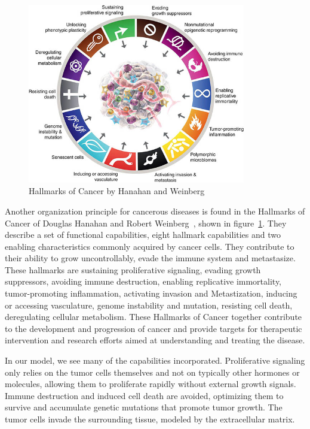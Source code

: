 \begin{figure}[h]
    \centering
    \includegraphics[width=0.85\textwidth]{resources/images/Hallmarks-of-Cancer.jpg}
    \caption{Hallmarks of Cancer by Hanahan and Weinberg~\cite{10.1158/2159-8290.CD-21-1059}}
    \label{fig:hallmarks_of_cancer}
\end{figure}
Another organization principle for cancerous diseases is found in the Hallmarks of Cancer of Douglas Hanahan and Robert Weinberg~\cite{10.1158/2159-8290.CD-21-1059}, shown in figure~\ref{fig:hallmarks_of_cancer}. They describe a set of functional capabilities, eight hallmark capabilities and two enabling characteristics commonly acquired by cancer cells. They contribute to their ability to grow uncontrollably, evade the immune system and metastasize. These hallmarks are sustaining proliferative signaling, evading growth suppressors, avoiding immune destruction, enabling replicative immortality, tumor-promoting inflammation, activating invasion and Metastization, inducing or accessing vasculature, genome instability and mutation, resisting cell death, deregulating cellular metabolism. These Hallmarks of Cancer together contribute to the development and progression of cancer and provide targets for therapeutic intervention and research efforts aimed at understanding and treating the disease. 

In our model, we see many of the capabilities incorporated. Proliferative signaling only relies on the tumor cells themselves and not on typically other hormones or molecules, allowing them to proliferate rapidly without external growth signals. Immune destruction and induced cell death are avoided, optimizing them to survive and accumulate genetic mutations that promote tumor growth. The tumor cells invade the surrounding tissue, modeled by the extracellular matrix.

